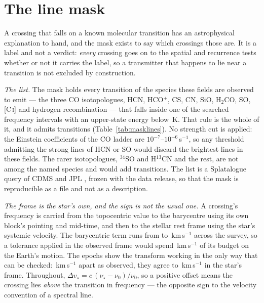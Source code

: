 \section{The line mask}
\label{app:linemask}

A crossing that falls on a known molecular transition has an astrophysical
explanation to hand, and the mask exists to say which crossings those are. It
is a label and not a verdict: \emph{every} crossing goes on to the spatial and
recurrence tests whether or not it carries the label, so a transmitter that
happens to lie near a transition is not excluded by construction.

\emph{The list.} The mask holds every transition of the \FrNSpec{} species
these fields are observed to emit --- the three CO isotopologues, HCN,
HCO$^{+}$, CS, CN, SiO, H$_2$CO, SO, [C\,\textsc{i}] and hydrogen
recombination --- that falls inside one of the \McNIsland{} searched frequency
intervals with an upper-state energy below \McEuMax\,K. That rule is the whole
of it, and it admits \FrNTrans{} transitions (Table~\ref{tab:masklines}). No
strength cut is applied: the Einstein coefficients of the CO ladder are
$10^{-7}$--$10^{-6}$\,s$^{-1}$, so any threshold admitting the strong lines of
HCN or SO would discard the brightest lines in these fields. The rarer
isotopologues, $^{34}$SO and H$^{13}$CN and the rest, are not among the named
species and would add \McNRare{} transitions. The list is a Splatalogue query
of CDMS and JPL \citep{Pickett1998,CDMS2005}, frozen with the data release, so
that the mask is reproducible as a file and not as a description.

\emph{The frame is the star's own, and the sign is not the usual one.} A
crossing's frequency is carried from the topocentric value to the barycentre
using its own block's pointing and mid-time, and then to the stellar rest
frame using the star's systemic velocity. The barycentric term runs from
\FrBaryLo{} to \FrBaryHi\,km\,s$^{-1}$ across the survey, so a tolerance
applied in the observed frame would spend \FrBarySwing\,km\,s$^{-1}$ of its
budget on the Earth's motion. The \FrEpochNEpoch{} \FrEpochStar{} epochs show
the transform working in the only way that can be checked:
\FrEpochTopoKms\,km\,s$^{-1}$ apart as observed, they agree to
\FrEpochStelKms\,km\,s$^{-1}$ in the star's frame. Throughout,
$\Delta v_\star = c\,(\nu_\star-\nu_0)/\nu_0$, so a positive offset means the
crossing lies \emph{above} the transition in frequency --- the opposite sign
to the velocity convention of a spectral line.

